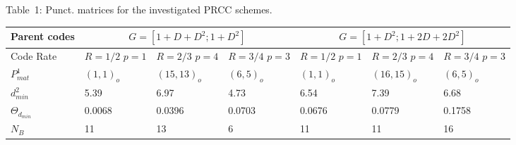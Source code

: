 \documentclass[12pt,twoside,onecolumn,a4paper,english]{IEEEtran2e}
\begin{document}
\begin{table}[h!]
\begin{center}
{Table~1: Punct. matrices for the
investigated PRCC schemes.}\\
\vspace{2ex}\footnotesize

\begin{tabular}{|p{0.5cm}||p{1.0cm}|p{0.7cm}|p{0.7cm}||p{1.0cm}|p{0.7cm}|p{0.7cm}|}

\hline
Parent codes   & \multicolumn{3}{c||}{$G=[1+D+D^2;1+D^2]$}            &
\multicolumn{3}{c|}{$G=[1+D^2;1+2D+2D^2]$}   \\   %
\hline
\hline Code Rate & $R=1/2$ $p=1$ &   $R={2}/{3}$ $p=4$ & $R=3/4$ $p=3$ & $R=1/2$ $p=1$ &   $R={2}/{3}$ $p=4$ & $R=3/4$ $p=3$   \\

\hline   $P^1_{mat}$ %
& $(1,1)_o$&$(15,13)_o$ &$(6,5)_o$  & $(1,1)_o$& $(16,15)_o$  &$(6,5)_o$ \\

\hline $d^2_{min}$ & 5.39 &  6.97 & 4.73  &6.54& 7.39 & $6.68$\\
\hline $\Theta_{d_{min}}$ & 0.0068  & 0.0396 & 0.0703 &0.0676&0.0779& 0.1758  \\
\hline $N_B$ & 11 &  13 & 6 &11&11&16 \\

  \hline
\end{tabular}
\end{center}
\end{table}
\end{document}
